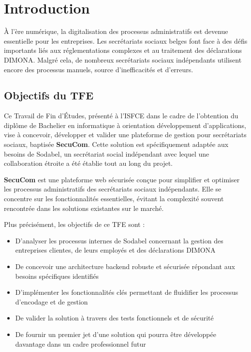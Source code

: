 \chapter*{Introduction}

À l'ère numérique, la digitalisation des processus administratifs est devenue essentielle pour les entreprises. Les secrétariats sociaux belges font face à des défis importants liés aux réglementations complexes et au traitement des déclarations DIMONA. Malgré cela, de nombreux secrétariats sociaux indépendants utilisent encore des processus manuels, source d'inefficacités et d'erreurs.

\section*{Objectifs du TFE}

Ce Travail de Fin d'Études, présenté à l'ISFCE dans le cadre de l'obtention du diplôme de Bachelier en informatique à orientation développement d'applications, vise à concevoir, développer et valider une plateforme de gestion pour secrétariats sociaux, baptisée \textbf{SecuCom}. Cette solution est spécifiquement adaptée aux besoins de Sodabel, un secrétariat social indépendant avec lequel une collaboration étroite a été établie tout au long du projet.

\vspace{0.5cm}

\begin{tcolorbox}[
  title={\textbf{SecuCom}},
  colback=blue!5!white,
  colframe=primarycolor,
  fonttitle=\bfseries,
  boxrule=0.5mm,
  arc=2mm,
  left=6mm,
  right=6mm,
  top=6mm,
  bottom=6mm
]\textbf{SecuCom} est une plateforme web sécurisée conçue pour simplifier et optimiser les processus administratifs des secrétariats sociaux indépendants. Elle se concentre sur les fonctionnalités essentielles, évitant la complexité souvent rencontrée dans les solutions existantes sur le marché.
\end{tcolorbox}

\vspace{0.5cm}


\noindent Plus précisément, les objectifs de ce TFE sont :
\begin{itemize}[leftmargin=*,label=\textcolor{darkgray}{$\bullet$},itemsep=0.3em]
  \item D'analyser les processus internes de Sodabel concernant la gestion des entreprises clientes, de leurs employés et des déclarations DIMONA
  \item De concevoir une architecture backend robuste et sécurisée répondant aux besoins spécifiques identifiés
  \item D'implémenter les fonctionnalités clés permettant de fluidifier les processus d'encodage et de gestion
  \item De valider la solution à travers des tests fonctionnels et de sécurité
  \item De fournir un premier jet d'une solution qui pourra être développée davantage dans un cadre professionnel futur
\end{itemize}

